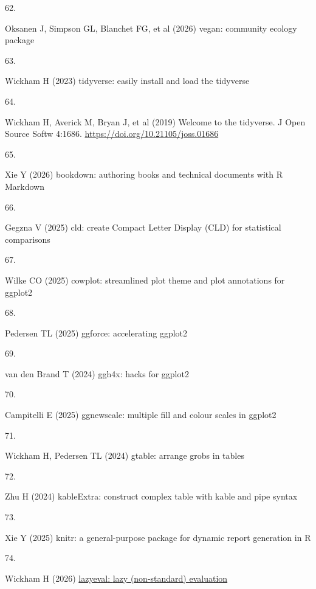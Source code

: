 \documentclass[
  12 pt,
]{article}
\newlength{\cslhangindent}
\newlength{\csllabelwidth}
\newenvironment{CSLReferences}[2] %
 {\begin{list}{}{%
  \setlength{\itemindent}{0pt}
  \setlength{\leftmargin}{0pt}
  \setlength{\parsep}{0pt}
  \ifodd #1
   \setlength{\leftmargin}{\cslhangindent}
   \setlength{\itemindent}{-1\cslhangindent}
  \fi
  \setlength{\itemsep}{#2\baselineskip}}}
 {\end{list}}
\newcommand{\CSLLeftMargin}[1]{\parbox[t]{\csllabelwidth}{\strut#1\strut}}
\newcommand{\CSLRightInline}[1]{\parbox[t]{\linewidth - \csllabelwidth}{\strut#1\strut}}
\begin{document}
\begin{CSLReferences}{0}{0}
\CSLLeftMargin{62. }%
\CSLRightInline{Oksanen J, Simpson GL, Blanchet FG, et al (2026) {vegan}: {community} ecology package}

\CSLLeftMargin{63. }%
\CSLRightInline{Wickham H (2023) {tidyverse}: {easily} install and load the tidyverse}

\CSLLeftMargin{64. }%
\CSLRightInline{Wickham H, Averick M, Bryan J, et al (2019) Welcome to the {tidyverse}. J Open Source Softw 4:1686. \url{https://doi.org/10.21105/joss.01686}}

\CSLLeftMargin{65. }%
\CSLRightInline{Xie Y (2026) {bookdown}: {authoring} books and technical documents with {R} {Markdown}}

\CSLLeftMargin{66. }%
\CSLRightInline{Gegzna V (2025) {cld}: {create} {Compact Letter Display} (CLD) for statistical comparisons}

\CSLLeftMargin{67. }%
\CSLRightInline{Wilke CO (2025) {cowplot}: {streamlined} plot theme and plot annotations for ggplot2}

\CSLLeftMargin{68. }%
\CSLRightInline{Pedersen TL (2025) {ggforce}: {accelerating} ggplot2}

\CSLLeftMargin{69. }%
\CSLRightInline{{van den Brand T} (2024) ggh4x: {hacks} for ggplot2}

\CSLLeftMargin{70. }%
\CSLRightInline{Campitelli E (2025) {ggnewscale}: {multiple} fill and colour scales in ggplot2}

\CSLLeftMargin{71. }%
\CSLRightInline{Wickham H, Pedersen TL (2024) {gtable}: {arrange} grobs in tables}

\CSLLeftMargin{72. }%
\CSLRightInline{Zhu H (2024) kableExtra: {construct} complex table with kable and pipe syntax}

\CSLLeftMargin{73. }%
\CSLRightInline{Xie Y (2025) {knitr}: {a} general-purpose package for dynamic report generation in {R}}

\CSLLeftMargin{74. }%
\CSLRightInline{Wickham H (2026) \href{https://doi.org/10.32614/CRAN.package.lazyeval}{{lazyeval}: {lazy} (non-standard) evaluation}}


\end{CSLReferences}
\end{document}
